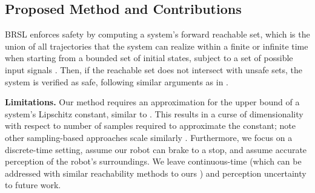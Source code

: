 \subsection{Proposed Method and Contributions}
BRSL enforces safety by computing a system's forward reachable set, which is the union of all trajectories that the system can realize within a finite or infinite time when starting from a bounded set of initial states, subject to a set of possible input signals \cite{conf:reach1984}. 
Then, if the reachable set does not intersect with unsafe sets, the system is verified as safe, following similar arguments as in \cite{kousik2020bridging,leung2020infusing,althoffphdthesis}.

\textbf{Limitations.}
Our method requires an approximation for the upper bound of a system's Lipschitz constant, similar to \cite{LewEtAl2021,koller2018learning,alanwar2020data_conf}.
This results in a curse of dimensionality with respect to number of samples required to approximate the constant; note other sampling-based approaches scale similarly \cite{LewEtAl2021,conf:modelBasedReachRL}. 
Furthermore, we focus on a discrete-time setting, assume our robot can brake to a stop, and assume accurate perception of the robot's surroundings.
We leave continuous-time (which can be addressed with similar reachability methods to ours \cite{conf:modelBasedReachRL,althoffphdthesis}) and perception uncertainty to future work. 



